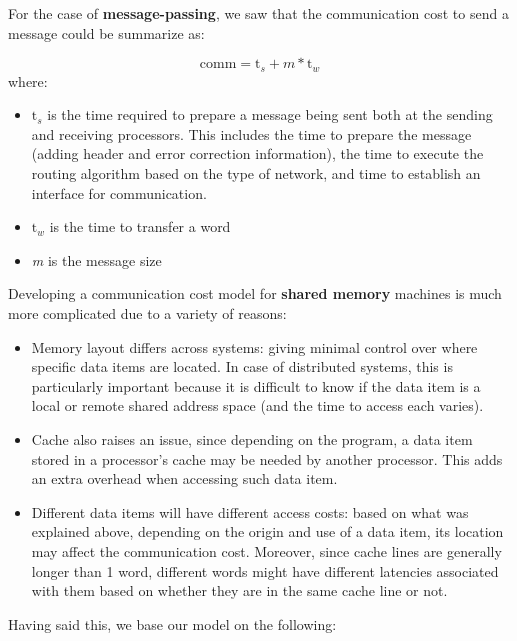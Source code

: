 \documentclass[12pt,twoside, parskip=full]{scrartcl}
\begin{document}
For the case of \textbf{message-passing}, we saw that the communication cost to send a message could be summarize as:

\begin{equation}
      \text{comm} = \text{t}_{s} + m * \text{t}_{w}
\end{equation}
where:

\begin{itemize}
\item $\text{t}_{s}$ is the time required to prepare a message being sent both at the sending and receiving processors. This includes the time to prepare the message (adding header and error correction information), the time to execute the routing algorithm based on the type of network, and time to establish an interface for communication. 

\item $\text{t}_{w}$ is the time to transfer a word

\item \textit{m} is the message size
\end{itemize}
Developing a communication cost model for \textbf{shared memory} machines is much more complicated due to a variety of reasons:

\begin{itemize}
	\item Memory layout differs across systems: giving minimal control over where specific data items are located. In case of distributed systems, this is particularly important because it is difficult to know if the data item is a local or remote shared address space (and the time to access each varies).
	
	\item Cache also raises an issue, since depending on the program, a data item stored in a processor's cache may be needed by another processor. This adds an extra overhead when accessing such data item.
	
	\item Different data items will have different access costs: based on what was explained above, depending on the origin and use of a data item, its location may affect the communication cost. Moreover, since cache lines are generally longer than 1 word, different words might have different latencies associated with them based on whether they are in the same cache line or not.
	
\end{itemize}

Having said this, we base our model on the following:
\end{document}

